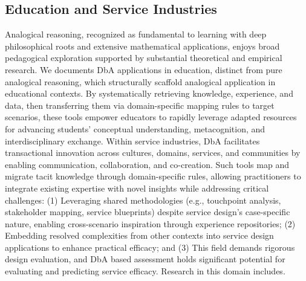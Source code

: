 \subsection{Education and Service Industries}%
Analogical reasoning, recognized as fundamental to learning\cite{winston1980learning} with deep philosophical roots and extensive mathematical applications, enjoys broad pedagogical exploration supported by substantial theoretical and empirical research\cite{bettin2023pedagogical}. We documents DbA applications in education, distinct from pure analogical reasoning, which structurally scaffold analogical application in educational contexts\cite{winston1980learning, bettin2023pedagogical}. By systematically retrieving knowledge, experience, and data, then transferring them via domain-specific mapping rules to target scenarios, these tools empower educators to rapidly leverage adapted resources for advancing students' conceptual understanding, metacognition, and interdisciplinary exchange\cite{karunathilaka2025intuit, chen2024BIDTrain, ball2019advancing}.
Within service industries, DbA facilitates transactional innovation across cultures, domains, services, and communities by enabling communication, collaboration, and co-creation. Such tools map and migrate tacit knowledge through domain-specific rules, allowing practitioners to integrate existing expertise with novel insights while addressing critical challenges\cite{moreno2014analogies, lee2020customized}: (1) Leveraging shared methodologies (e.g., touchpoint analysis, stakeholder mapping, service blueprints\cite{stickdorn2012service}) despite service design's case-specific nature, enabling cross-scenario inspiration through experience repositories; (2) Embedding resolved complexities from other contexts into service design applications to enhance practical efficacy; and (3) This field demands rigorous design evaluation, and DbA based assessment holds significant potential for evaluating and predicting service efficacy. Research in this domain includes\cite{chen2024BIDTrain, kim2023star, dougan2022predicting, jiayang2023storyanalogy, cao2025medai, shao2025unlock, bettin2023pedagogical, Ju2025toward, karunathilaka2025intuit, vattam2011dane, la2020designing, moreno2014analogies, lee2020customized, lupiani2017monitoring}.
